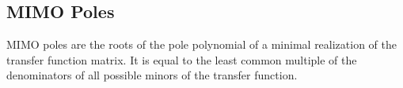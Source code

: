 \subsection{MIMO Poles}
MIMO poles are the roots of the pole polynomial of a minimal realization of the transfer function matrix. It is equal to the least common multiple of the denominators of all possible minors of the transfer function.